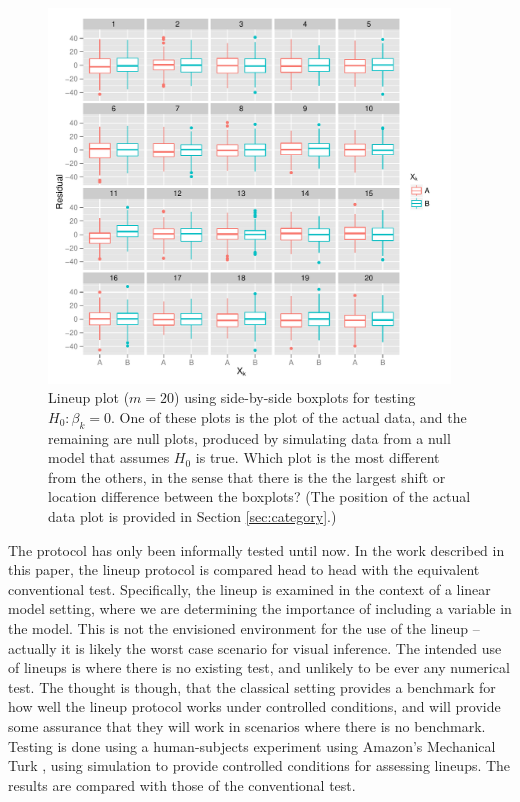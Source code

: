 \documentclass{article}
\begin{document}
\begin{figure}[htp]
   \centering
       \includegraphics[width=0.95\textwidth]{lineup_category.pdf}
       \caption{Lineup plot ($m=20$) using side-by-side boxplots for testing $H_0: \beta_k=0$. One of these plots is the plot of the actual data, and the remaining are null plots, produced by simulating data from a null model that assumes $H_0$ is true. Which plot is the most different from the others, in the sense that there is the the largest shift or location difference between the boxplots? (The position of the actual data plot is provided in Section \ref{sec:category}.)}
       \label{fig:test_category}
\end{figure}

The protocol has only been informally tested until now. In the work described in this paper, the lineup protocol is compared head to head with the equivalent conventional test. Specifically, the lineup is examined in the context of a linear model setting, where we are determining the importance of including a variable in the model. This is not the envisioned environment for the use of the lineup -- actually it is likely the worst case scenario for visual inference. The intended use of lineups is where there is no existing test, and unlikely to be ever any numerical test. The thought is though, that the classical setting provides a benchmark for how well the lineup protocol works under controlled conditions, and will provide some assurance that they will work in scenarios where there is no benchmark. Testing is done using a human-subjects experiment using Amazon's Mechanical Turk \citep{turk}, using simulation to provide controlled conditions for assessing lineups. The results are compared with those of the conventional test. 
\end{document}

